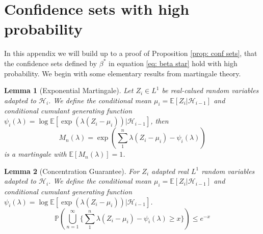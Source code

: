 \documentclass{article}
\newtheorem{lemma}{Lemma}
\newcommand{\Exp}{\mathds{E}}
\newcommand{\Prob}{\mathds{P}}
\begin{document}
\appendix

\section{Confidence sets with high probability}
\label{app: conf sets}
In this appendix we will build up to a proof of Proposition \ref{prop: conf sets}, that the confidence sets defined by $\beta^*$ in equation \ref{eq: beta star} hold with high probability.
We begin with some elementary results from martingale theory.

\begin{lemma}[Exponential Martingale]
\hspace{0.000000001mm} \newline
Let $Z_i \in L^1$ be real-calued random variables adapted to $\mathcal{H}_i$.
We define the conditional mean $\mu_i = \Exp[ Z_i | \mathcal{H}_{i-1} ] $ and conditional cumulant generating function $\psi_i(\lambda) = \log \Exp [ \exp \left(\lambda ( Z_i -\mu_i)\right) | \mathcal{H}_{i-1} ] $, then
$$ M_n ( \lambda ) = \exp \left( \sum_1^n \lambda (Z_i -\mu_i) - \psi_i(\lambda) \right) $$
is a martingale with $\Exp[M_n(\lambda)] = 1$.
\end{lemma}

\begin{lemma}[Concentration Guarantee]
\label{lem: mg conc} \hspace{0.000000001mm} \newline
For $Z_i$ adapted real $L^1$ random variables adapted to $\mathcal{H}_i$. We define the conditional mean $\mu_i = \Exp[ Z_i | \mathcal{H}_{i-1} ] $ and conditional cumulant generating function $\psi_i(\lambda) = \log \Exp [ \exp \left(\lambda ( Z_i -\mu_i)\right) | \mathcal{H}_{i-1} ] $.
$$ \Prob \left( \bigcup_{n=1}^\infty \{ \sum_1^n \lambda (Z_i -\mu_i) - \psi_i(\lambda) \ge x\} \right) \le e^{-x}$$
\end{lemma}
\end{document}
